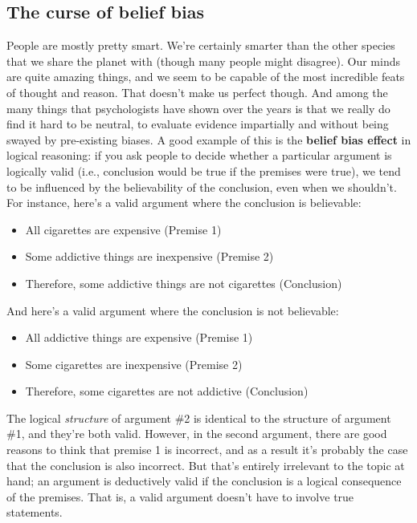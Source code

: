 \documentclass[
]{book}
\providecommand{\tightlist}{%
  \setlength{\itemsep}{0pt}\setlength{\parskip}{0pt}}
\begin{document}
\hypertarget{the-curse-of-belief-bias}{%
\subsection{The curse of belief bias}\label{the-curse-of-belief-bias}}

People are mostly pretty smart. We're certainly smarter than the other species that we share the planet with (though many people might disagree). Our minds are quite amazing things, and we seem to be capable of the most incredible feats of thought and reason. That doesn't make us perfect though. And among the many things that psychologists have shown over the years is that we really do find it hard to be neutral, to evaluate evidence impartially and without being swayed by pre-existing biases. A good example of this is the {\textbf{belief bias effect}} in logical reasoning: if you ask people to decide whether a particular argument is logically valid (i.e., conclusion would be true if the premises were true), we tend to be influenced by the believability of the conclusion, even when we shouldn't. For instance, here's a valid argument where the conclusion is believable:

\begin{itemize}
\tightlist
\item
  All cigarettes are expensive (Premise 1)
\item
  Some addictive things are inexpensive (Premise 2)
\item
  Therefore, some addictive things are not cigarettes (Conclusion)
\end{itemize}

And here's a valid argument where the conclusion is not believable:

\begin{itemize}
\tightlist
\item
  All addictive things are expensive (Premise 1)
\item
  Some cigarettes are inexpensive (Premise 2)
\item
  Therefore, some cigarettes are not addictive (Conclusion)
\end{itemize}

The logical \emph{structure} of argument \#2 is identical to the structure of argument \#1, and they're both valid. However, in the second argument, there are good reasons to think that premise 1 is incorrect, and as a result it's probably the case that the conclusion is also incorrect. But that's entirely irrelevant to the topic at hand; an argument is deductively valid if the conclusion is a logical consequence of the premises. That is, a valid argument doesn't have to involve true statements.
\end{document}
